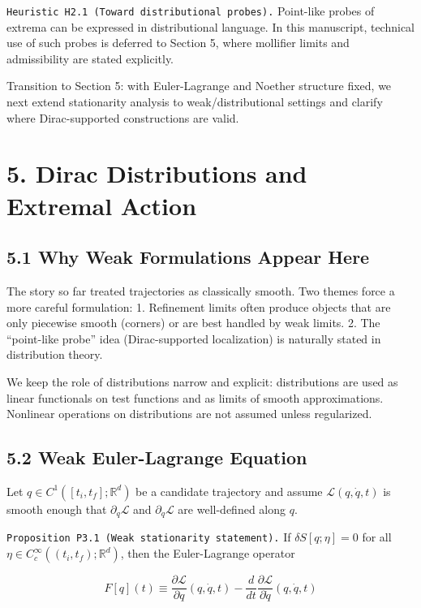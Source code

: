 \documentclass[
]{article}
\begin{document}
\texttt{Heuristic\ H2.1\ (Toward\ distributional\ probes).} Point-like
probes of extrema can be expressed in distributional language. In this
manuscript, technical use of such probes is deferred to Section 5, where
mollifier limits and admissibility are stated explicitly.

Transition to Section 5: with Euler-Lagrange and Noether structure
fixed, we next extend stationarity analysis to weak/distributional
settings and clarify where Dirac-supported constructions are valid.

\section{5. Dirac Distributions and Extremal
Action}\label{dirac-distributions-and-extremal-action}

\subsection{5.1 Why Weak Formulations Appear
Here}\label{why-weak-formulations-appear-here}

The story so far treated trajectories as classically smooth. Two themes
force a more careful formulation: 1. Refinement limits often produce
objects that are only piecewise smooth (corners) or are best handled by
weak limits. 2. The ``point-like probe'' idea (Dirac-supported
localization) is naturally stated in distribution theory.

We keep the role of distributions narrow and explicit: distributions are
used as linear functionals on test functions and as limits of smooth
approximations. Nonlinear operations on distributions are not assumed
unless regularized.

\subsection{5.2 Weak Euler-Lagrange
Equation}\label{weak-euler-lagrange-equation}

Let \(q\in C^1([t_i,t_f];\mathbb R^d)\) be a candidate trajectory and
assume \(\mathcal L(q,\dot q,t)\) is smooth enough that
\(\partial_q\mathcal L\) and \(\partial_{\dot q}\mathcal L\) are
well-defined along \(q\).

\texttt{Proposition\ P3.1\ (Weak\ stationarity\ statement).} If
\(\delta S[q;\eta]=0\) for all
\(\eta\in C_c^\infty((t_i,t_f);\mathbb R^d)\), then the Euler-Lagrange
operator

\[
F[q](t)\equiv \frac{\partial\mathcal L}{\partial q}(q,\dot q,t)
-\frac{d}{dt}\frac{\partial\mathcal L}{\partial\dot q}(q,\dot q,t)
\]
\end{document}
